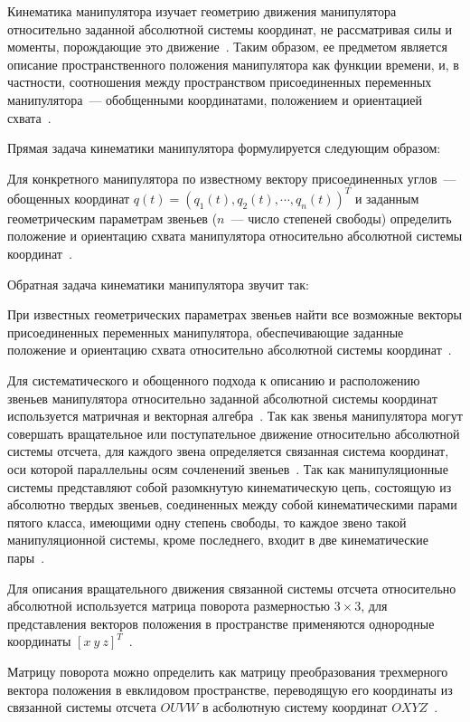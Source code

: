 \documentclass[oneside, final, 14pt]{extarticle}
\begin{document}
Кинематика манипулятора изучает геометрию движения манипулятора относительно заданной абсолютной системы координат, не рассматривая силы и моменты, порождающие это движение~\cite{fu:rob_tech}.
Таким образом, ее предметом является описание пространственного положения манипулятора как функции времени, и, в частности, соотношения между пространством присоединенных переменных манипулятора~--- обобщенными координатами, положением и ориентацией схвата~\cite{fu:rob_tech}.
\par
Прямая задача кинематики манипулятора формулируется следующим образом:
\par
Для конкретного манипулятора по известному вектору присоединенных углов~--- обощенных координат \(q(t) = (q_1(t),q_2(t), \cdots, q_n(t))^T\) и заданным геометрическим параметрам звеньев (\(n\)~--- число степеней свободы) определить положение и ориентацию схвата манипулятора относительно абсолютной системы координат~\cite{fu:rob_tech}.
\par
Обратная задача кинематики манипулятора звучит так:
\par
При известных геометрических параметрах звеньев найти все возможные векторы присоединенных переменных манипулятора, обеспечивающие заданные положение и ориентацию схвата относительно абсолютной системы координат~\cite{fu:rob_tech}.
\par
Для систематического и обощенного подхода к описанию и расположению звеньев манипулятора относительно заданной абсолютной системы координат используется матричная и векторная алгебра~\cite{fu:rob_tech, shahinpur:rob_tech}.
Так как звенья манипулятора могут совершать вращательное или поступательное движение относительно абсолютной системы отсчета, для каждого звена определяется связанная система координат, оси которой параллельны осям сочленений звеньев~\cite{fu:rob_tech}.
Так как манипуляционные системы представляют собой разомкнутую кинематическую цепь, состоящую из абсолютно твердых звеньев, соединенных между собой кинематическими парами пятого класса, имеющими одну степень свободы, то каждое звено такой манипуляционной системы, кроме последнего, входит в две кинематические пары~\cite{krahmalev:mod_rob}.
\par
Для описания вращательного движения связанной системы отсчета относительно абсолютной используется матрица поворота размерностью \(3 \times 3\), для представления векторов положения в пространстве применяются однородные координаты \( [x\:y\:z]^T\)~\cite{fu:rob_tech, shahinpur:rob_tech}.
\par
Матрицу поворота можно определить как матрицу преобразования трехмерного вектора положения в евклидовом пространстве, переводящую его координаты из связанной системы отсчета \(OUVW\) в асболютную систему координат \(OXYZ\)~\cite{fu:rob_tech}.
\end{document}
